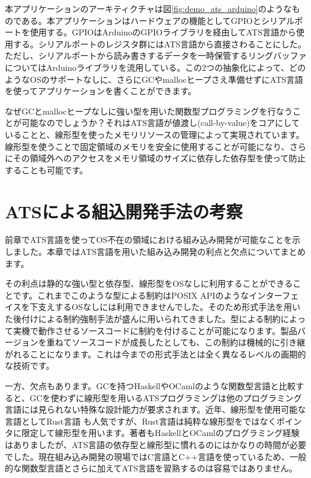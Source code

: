 \documentclass{ipsjprosym}
\begin{document}
本アプリケーションのアーキティクチャは図\ref{fig:demo_ats_arduino}のようなものである。本アプリケーションはハードウェアの機能としてGPIOとシリアルポートを使用する。GPIOはArduinoのGPIOライブラリを経由してATS言語から使用する。シリアルポートのレジスタ群にはATS言語から直接さわることにした。ただし、シリアルポートから読み書きするデータを一時保管するリングバッファについてはArduinoライブラリを流用している。この2つの抽象化によって、どのようなOSのサポートなしに、さらにGCやmallocヒープさえ準備せずにATS言語を使ってアプリケーションを書くことができます。

なぜGCとmallocヒープなしに強い型を用いた関数型プログラミングを行なうことが可能なのでしょうか？それはATS言語が値渡し(call-by-value)をコアにしていることと、線形型を使ったメモリリソースの管理によって実現されています。線形型を使うことで固定領域のメモリを安全に使用することが可能になり、さらにその領域外へのアクセスをメモリ領域のサイズに依存した依存型を使って防止することも可能です。

\section{ATSによる組込開発手法の考察}

前章でATS言語を使ってOS不在の領域における組み込み開発が可能なことを示しました。本章ではATS言語を用いた組み込み開発の利点と欠点についてまとめます。

その利点は静的な強い型と依存型、線形型をOSなしに利用することができることです。これまでこのような型による制約はPOSIX APIのようなインターフェイスを下支えするOSなしには利用できませんでした。そのため形式手法を用いた後付けによる制約強制手法が盛んに用いられてきました。型による制約によって実機で動作させるソースコードに制約を付けることが可能になります。製品バージョンを重ねてソースコードが成長したとしても、この制約は機械的に引き継がれることになります。これは今までの形式手法とは全く異なるレベルの画期的な技術です。

一方、欠点もあります。GCを持つHaskellやOCamlのような関数型言語と比較すると、GCを使わずに線形型を用いるATSプログラミングは他のプログラミング言語には見られない特殊な設計能力が要求されます。近年、線形型を使用可能な言語としてRust言語 \cite{rust} も人気ですが、Rust言語は純粋な線形型をではなくポインタに限定して線形型を用います。著者もHaskellとOCamlのプログラミング経験はありましたが、ATS言語の依存型と線形型に慣れるのにはかなりの時間が必要でした。現在組み込み開発の現場ではC言語とC++言語を使っているため、一般的な関数型言語とさらに加えてATS言語を習熟するのは容易ではありません。
\end{document}
